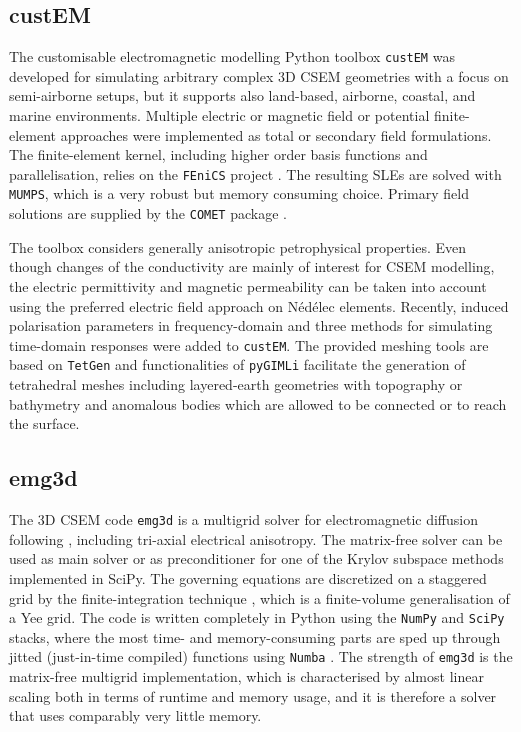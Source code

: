 \documentclass[extra, camera,%
]{gji}
\newcommand{\emg}[2]{\texttt{emg#1#2}\xspace}
\newcommand{\custem}{\texttt{custEM}\xspace}
\begin{document}
\subsection{custEM}

The customisable electromagnetic modelling Python toolbox \custem was developed for simulating arbitrary complex 3D CSEM geometries with a focus on semi-airborne setups, but it supports also land-based, airborne, coastal, and marine environments. Multiple electric or magnetic field or potential finite-element approaches were implemented as total or secondary field formulations. The finite-element kernel, including higher order basis functions and parallelisation, relies on the \texttt{FEniCS} project \citep{B.SPR.12.Logg, B.SPR.16.Langtangen}. The resulting SLEs are solved with \texttt{MUMPS}, which is a very robust but memory consuming choice. Primary field solutions are supplied by the \texttt{COMET} package \citep{GEO.20.Skibbe}.

The toolbox considers generally anisotropic petrophysical properties. Even though changes of the conductivity are mainly of interest for CSEM modelling, the electric permittivity and magnetic permeability can be taken into account using the preferred electric field approach on Nédélec elements. Recently, induced polarisation parameters in frequency-domain  and three methods for simulating time-domain responses were added to \custem. The provided meshing tools are based on \texttt{TetGen} \citep{TOM.15.Si} and functionalities of \texttt{pyGIMLi} facilitate the generation of tetrahedral meshes including layered-earth geometries with topography or bathymetry and anomalous bodies which are allowed to be connected or to reach the surface.

\subsection{emg3d}

The 3D CSEM code \emg3d is a multigrid solver \citep{CMMP.64.Fedorenko} for electromagnetic diffusion following \cite{GP.06.Mulder}, including tri-axial electrical anisotropy. The matrix-free solver can be used as main solver or as preconditioner for one of the Krylov subspace methods implemented in SciPy. The governing equations are discretized on a staggered grid by the finite-integration technique \citep{AEU.77.Weiland}, which is a finite-volume generalisation of a Yee grid. The code is written completely in Python using the \texttt{NumPy} and \texttt{SciPy} stacks, where the most time- and memory-consuming parts are sped up through jitted (just-in-time compiled) functions using \texttt{Numba} \citep{LLVM.15.Lam}. The strength of \emg3d is the matrix-free multigrid implementation, which is characterised by almost linear scaling both in terms of runtime and memory usage, and it is therefore a solver that uses comparably very little memory.
\end{document}
